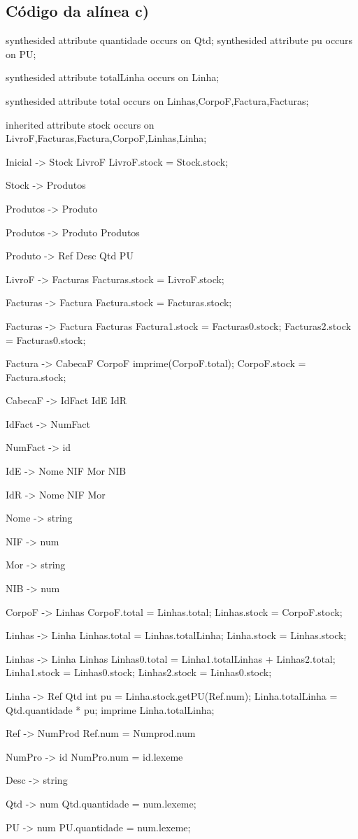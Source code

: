 \documentclass[11pt,a4paper]{article}
\begin{document}
\subsection{Código da alínea c)}
\begin{code_txt}
synthesided attribute quantidade occurs on Qtd;
synthesided attribute pu occurs on PU;

synthesided attribute totalLinha occurs on Linha;

synthesided attribute total occurs on Linhas,CorpoF,Factura,Facturas;

inherited attribute stock occurs on LivroF,Facturas,Factura,CorpoF,Linhas,Linha;



Inicial -> Stock LivroF { LivroF.stock = Stock.stock; }

Stock -> Produtos

Produtos -> Produto

Produtos -> Produto Produtos

Produto -> Ref Desc Qtd PU

LivroF -> Facturas { Facturas.stock = LivroF.stock;}

Facturas -> Factura {Factura.stock = Facturas.stock;}

Facturas -> Factura Facturas {Factura1.stock = Facturas0.stock; Facturas2.stock = Facturas0.stock;}

Factura -> CabecaF CorpoF { imprime(CorpoF.total); CorpoF.stock = Factura.stock;}

CabecaF -> IdFact IdE IdR

IdFact -> NumFact

NumFact -> id

IdE -> Nome NIF Mor NIB

IdR -> Nome NIF Mor

Nome -> string

NIF -> num

Mor -> string

NIB -> num

CorpoF -> Linhas {CorpoF.total = Linhas.total; Linhas.stock = CorpoF.stock;}

Linhas -> Linha {Linhas.total = Linhas.totalLinha; Linha.stock = Linhas.stock;}

Linhas -> Linha Linhas {Linhas0.total = Linha1.totalLinhas + Linhas2.total; Linha1.stock = Linhas0.stock; Linhas2.stock = Linhas0.stock; }

Linha -> Ref Qtd { int pu = Linha.stock.getPU(Ref.num);
  Linha.totalLinha = Qtd.quantidade * pu;
imprime Linha.totalLinha;
}

Ref -> NumProd { Ref.num = Numprod.num}

NumPro -> id {NumPro.num = id.lexeme}

Desc -> string

Qtd -> num { Qtd.quantidade = num.lexeme;}

PU -> num { PU.quantidade = num.lexeme;}




\end{code_txt}
\newpage
\end{document}
